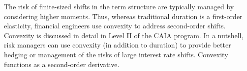 \documentclass[11pt]{article}
\begin{document}
The risk of finite-sized shifts in the term structure are typically managed by considering higher moments. Thus, whereas traditional duration is a first-order elasticity, financial engineers use convexity to address second-order shifts. Convexity is discussed in detail in Level II of the CAIA program. In a nutshell, risk managers can use convexity (in addition to duration) to provide better hedging or management of the risks of large interest rate shifts. Convexity functions as a second-order derivative.
\end{document}
